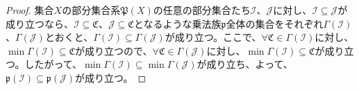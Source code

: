 \documentclass[dvipdfmx]{jsarticle}
\begin{document}
\begin{proof}
集合$X$の部分集合系$\mathfrak{P}(X)$の任意の部分集合たち$\mathcal{I}$、$\mathcal{J}$に対し、$\mathcal{I \subseteq J}$が成り立つなら、$\mathcal{I \subseteq}\mathfrak{C}$、$\mathcal{J}\subseteq \mathfrak{C}$となるような乗法族$\mathfrak{p}$全体の集合をそれぞれ$\varGamma\left( \mathcal{I} \right)$、$\varGamma\left( \mathcal{J} \right)$とおくと、$\varGamma\left( \mathcal{I} \right) \subseteq \varGamma\left( \mathcal{J} \right)$が成り立つ。ここで、$\mathfrak{\forall C \in}\varGamma\left( \mathcal{I} \right)$に対し、$\min{\varGamma\left( \mathcal{I} \right)}\subseteq \mathfrak{C}$が成り立つので、$\mathfrak{\forall C \in}\varGamma\left( \mathcal{J} \right)$に対し、$\min{\varGamma\left( \mathcal{I} \right)}\subseteq \mathfrak{C}$が成り立つ。したがって、$\min{\varGamma\left( \mathcal{I} \right)} \subseteq \min{\varGamma\left( \mathcal{J} \right)}$が成り立ち、よって、$\mathfrak{p}\left( \mathcal{I} \right)\subseteq \mathfrak{p}\left( \mathcal{J} \right)$が成り立つ。
\end{proof}
\end{document}
